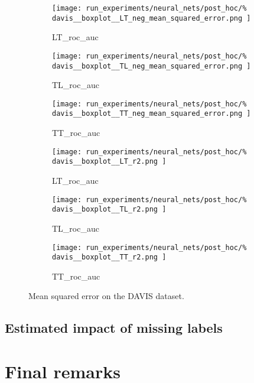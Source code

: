 \documentclass[conference]{IEEEtran}
\begin{document}
\begin{figure*}
    \centering
    \begin{subfigure}{0.32\textwidth}
        \texttt{[image: 
            run\_experiments/neural\_nets/post\_hoc/\%
            davis\_\_boxplot\_\_LT\_neg\_mean\_squared\_error.png
        ]}
        \caption{LT\_roc\_auc}
    \end{subfigure}
    \begin{subfigure}{0.32\textwidth}
        \texttt{[image: 
            run\_experiments/neural\_nets/post\_hoc/\%
            davis\_\_boxplot\_\_TL\_neg\_mean\_squared\_error.png
        ]}
        \caption{TL\_roc\_auc}
    \end{subfigure}
    \begin{subfigure}{0.32\textwidth}
        \texttt{[image: 
            run\_experiments/neural\_nets/post\_hoc/\%
            davis\_\_boxplot\_\_TT\_neg\_mean\_squared\_error.png
        ]}
        \caption{TT\_roc\_auc}
    \end{subfigure}

    \begin{subfigure}{0.32\textwidth}
        \texttt{[image: 
            run\_experiments/neural\_nets/post\_hoc/\%
            davis\_\_boxplot\_\_LT\_r2.png
        ]}
        \caption{LT\_roc\_auc}
    \end{subfigure}
    \begin{subfigure}{0.32\textwidth}
        \texttt{[image: 
            run\_experiments/neural\_nets/post\_hoc/\%
            davis\_\_boxplot\_\_TL\_r2.png
        ]}
        \caption{TL\_roc\_auc}
    \end{subfigure}
    \begin{subfigure}{0.32\textwidth}
        \texttt{[image: 
            run\_experiments/neural\_nets/post\_hoc/\%
            davis\_\_boxplot\_\_TT\_r2.png
        ]}
        \caption{TT\_roc\_auc}
    \end{subfigure}
    \caption{Mean squared error on the DAVIS dataset.}
    \label{fig:davis_mse}
\end{figure*}


\subsection{Estimated impact of missing labels}


\section{Final remarks}
\end{document}
